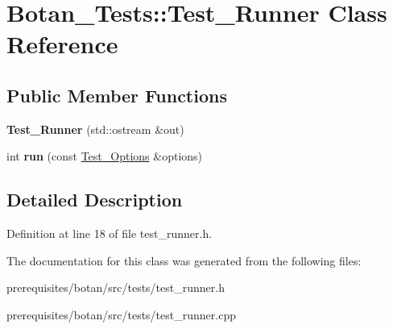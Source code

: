 \hypertarget{class_botan___tests_1_1_test___runner}{}\section{Botan\+\_\+\+Tests\+:\+:Test\+\_\+\+Runner Class Reference}
\label{class_botan___tests_1_1_test___runner}
\subsection*{Public Member Functions}
\begin{DoxyCompactItemize}
\item 
\mbox{\label{class_botan___tests_1_1_test___runner_ae74399d1ca27f484b4dba20a470eaeb9}} 
{\bfseries Test\+\_\+\+Runner} (std\+::ostream \&out)
\item 
\mbox{\label{class_botan___tests_1_1_test___runner_ad572c243fc31df7ad4ed6687f2ef9648}} 
int {\bfseries run} (const \mbox{\hyperlink{class_botan___tests_1_1_test___options}{Test\+\_\+\+Options}} \&options)
\end{DoxyCompactItemize}


\subsection{Detailed Description}


Definition at line 18 of file test\+\_\+runner.\+h.



The documentation for this class was generated from the following files\+:\begin{DoxyCompactItemize}
\item 
prerequisites/botan/src/tests/test\+\_\+runner.\+h\item 
prerequisites/botan/src/tests/test\+\_\+runner.\+cpp\end{DoxyCompactItemize}
